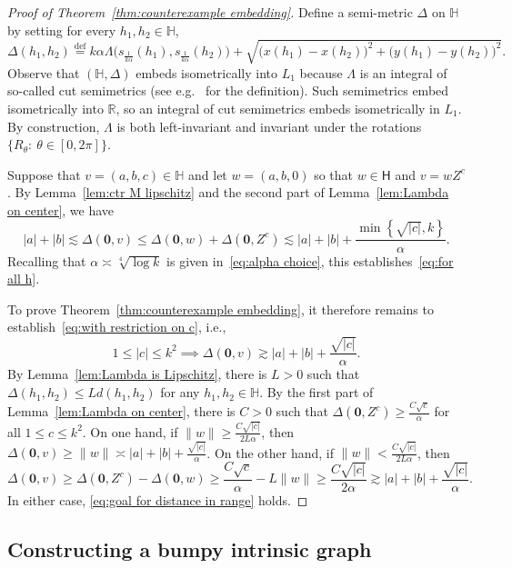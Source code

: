 \documentclass[11pt,reqno]{amsart}
\renewcommand{\H}{\mathbb{H}}
\newcommand{\R}{\mathbb{R}}
\renewcommand{\approx}{\asymp}
\newcommand{\0}{\mathbf{0}}
\renewcommand{\1}{\mathbf 1}
\newcommand{\eqdef}{\stackrel{\mathrm{def}}{=}}
\renewcommand{\ge}{\geqslant}
\renewcommand{\le}{\leqslant}
\theoremstyle{remark}
\begin{document}
  \begin{proof}[Proof of Theorem~\ref{thm:counterexample embedding}] Define a semi-metric $\Delta$ on $\H$ by setting for every $h_1,h_2\in \H$,
 \begin{equation}\label{eq:def Delta}
  \Delta(h_1,h_2)\eqdef k\alpha \Lambda\big(s_{\frac{1}{k\alpha}}(h_1),s_{\frac{1}{k\alpha}}(h_2)\big)+\sqrt{\big(x(h_1)-x(h_2)\big)^2+\big(y(h_1)-y(h_2)\big)^2}.
\end{equation}
Observe that $(\H,\Delta)$ embeds isometrically into $L_1$ because $\Lambda$ is an integral of so-called cut semimetrics (see e.g.~\cite[4.1]{DL97} for the definition). Such semimetrics embed isometrically into $\R$, so an integral of cut semimetrics embeds isometrically in $L_1$. By construction, $\Lambda$ is both left-invariant and invariant under the rotations $\{R_\theta:\ \theta\in [0,2\pi]\}$.

 Suppose that $v=(a,b,c)\in \H$ and let $w=(a,b,0)$ so that $w\in \mathsf{H}$ and $v=wZ^c$.  By Lemma~\ref{lem:ctr M lipschitz} and the second part of Lemma~\ref{lem:Lambda on center}, we have
 $$
|a|+|b|\lesssim \Delta(\0,v)\le \Delta(\0,w)+\Delta(\0,Z^c)\lesssim |a|+|b|+\frac{\min\left\{\sqrt{|c|},k\right\}}{\alpha}.
 $$
 Recalling that $\alpha\asymp \sqrt[4]{\log k}$ is given in~\eqref{eq:alpha choice}, this establishes~\eqref{eq:for all h}.

 To prove Theorem~\ref{thm:counterexample embedding}, it therefore remains to establish~\eqref{eq:with restriction on c}, i.e.,
 \begin{equation}\label{eq:goal for distance in range}
   1\le |c|\le k^2\implies  \Delta(\0,v)\gtrsim  |a|+|b|+\frac{\sqrt{|c|}}{\alpha}.
 \end{equation}
 By Lemma~\ref{lem:Lambda is Lipschitz}, there is  $L>0$ such that $\Delta(h_1,h_2)\le L d(h_1,h_2)$ for any $h_1,h_2\in \H$. By the first part of Lemma~\ref{lem:Lambda on center}, there is  $C>0$ such that $\Delta(\0,Z^c)\ge \frac{C\sqrt{c}}{\alpha}$ for all $1\le c \le k^2$.  On one hand, if $\|w\| \ge \frac{C\sqrt{|c|}}{2 L \alpha}$, then $\Delta(\0,v)\ge \|w\| \approx |a|+|b|+\frac{\sqrt{|c|}}{\alpha}$.  On the other hand, if $\|w\| < \frac{C \sqrt{|c|}}{2 L \alpha}$, then
 $$\Delta(\0,v)\ge \Delta(\0,Z^c)-\Delta(\0,w) \ge \frac{C\sqrt{c}}{\alpha} - L\|w\| \ge \frac{C \sqrt{|c|}}{2\alpha}\gtrsim |a|+|b|+\frac{\sqrt{|c|}}{\alpha}.$$
 In either case, \eqref{eq:goal for distance in range} holds.
\end{proof}

\subsection{Constructing a bumpy intrinsic graph}\label{sec:start construction}
\end{document}
